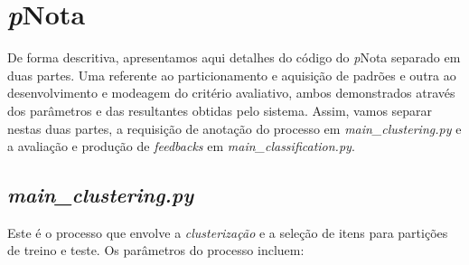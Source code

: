 %
%

\chapter{\textit{p}Nota}
\label{manual-pNota}

De forma descritiva, apresentamos aqui detalhes do código do \textit{p}Nota separado em duas partes. Uma referente ao particionamento e aquisição de padrões e outra ao desenvolvimento e modeagem do critério avaliativo, ambos demonstrados através dos parâmetros e das resultantes obtidas pelo sistema. Assim, vamos separar nestas duas partes, a requisição de anotação do processo em \textit{main\_clustering.py} e a avaliação e produção de \textit{feedbacks} em \textit{main\_classification.py}.

\section{\textit{main\_clustering.py}}

Este é o processo que envolve a \textit{clusterização} e a seleção de itens para partições de treino e teste. Os parâmetros do processo incluem:



